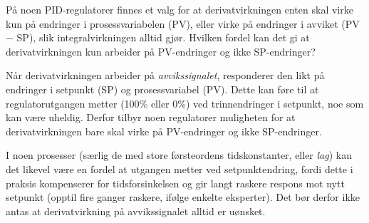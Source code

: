 
På noen PID-regulatorer finnes et valg for at derivatvirkningen enten skal virke kun på endringer i prosessvariabelen (PV), eller virke på endringer i avviket (PV $-$ SP), slik integralvirkningen alltid gjør. Hvilken fordel kan det gi at derivatvirkningen kun arbeider på PV-endringer og ikke SP-endringer?







Når derivatvirkningen arbeider på {\it avvikssignalet}, responderer den likt på endringer i setpunkt (SP) og prosessvariabel (PV). Dette kan føre til at regulatorutgangen metter (100\% eller 0\%) ved trinnendringer i setpunkt, noe som kan være uheldig. Derfor tilbyr noen regulatorer muligheten for at derivatvirkningen bare skal virke på PV-endringer og ikke SP-endringer.







I noen prosesser (særlig de med store førsteordens tidskonstanter, eller {\it lag}) kan det likevel være en fordel at utgangen metter ved setpunktendring, fordi dette i praksis kompenserer for tidsforsinkelsen og gir langt raskere respons mot nytt setpunkt (opptil fire ganger raskere, ifølge enkelte eksperter). Det bør derfor ikke antas at derivatvirkning på avvikssignalet alltid er uønsket.


